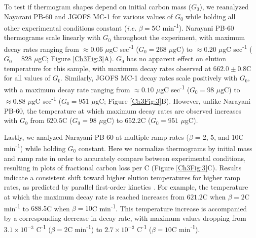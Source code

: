 To test if thermogram shapes depend on initial carbon mass ($G_0$), we reanalyzed Nayarani PB-60 and JGOFS MC-1 for various values of $G_0$ while holding all other experimental conditions constant (\textit{i.e.} $\beta = 5$\textdegree C min\textsuperscript{-1}). Narayani PB-60 thermograms scale linearly with $G_0$ throughout the experiment, with maximum decay rates ranging from $\approx 0.06$ $\mu$gC sec\textsuperscript{-1} ($G_0 = 268$ $\mu$gC) to $\approx 0.20$ $\mu$gC sec\textsuperscript{-1} ($G_0 = 828$ $\mu$gC; Figure \ref{Ch3Fig:3}A). $G_0$ has no apparent effect on elution temperature for this sample, with maximum decay rates observed at $662.0 \pm 0.8$\textdegree C for all values of $G_0$. Similarly, JGOFS MC-1 decay rates scale positively with $G_0$, with a maximum decay rate ranging from $\approx 0.10$ $\mu$gC sec\textsuperscript{-1} ($G_0 = 98$ $\mu$gC) to $\approx 0.88$ $\mu$gC sec\textsuperscript{-1} ($G_0 = 951$ $\mu$gC; Figure \ref{Ch3Fig:3}B). However, unlike Narayani PB-60, the temperature at which maximum decay rates are observed increases with $G_0$ from $620.5$\textdegree C ($G_0 = 98$ $\mu$gC) to $652.2$\textdegree C ($G_0 = 951$ $\mu$gC).

Lastly, we analyzed Narayani PB-60 at multiple ramp rates ($\beta$ = 2, 5, and 10\textdegree C min\textsuperscript{-1}) while holding $G_0$ constant. Here we normalize thermograms by initial mass and ramp rate in order to accurately compare between experimental conditions, resulting in plots of fractional carbon loss per \textdegree C (Figure \ref{Ch3Fig:3}C). Results indicate a consistent shift toward higher elution temperatures for higher ramp rates, as predicted by parallel first-order kinetics \citep{Braun:1987vf,Miura:1995uo,Miura:1998jf}. For example, the temperature at which the maximum decay rate is reached increases from $621.2$\textdegree C when $\beta = 2$\textdegree C min\textsuperscript{-1} to $688.5$\textdegree C when $\beta = 10$\textdegree C min\textsuperscript{-1}. This temperature increase is accompanied by a corresponding decrease in decay rate, with maximum values dropping from $3.1 \times 10^{-3}$ \textdegree C\textsuperscript{-1} ($\beta = 2$\textdegree C min\textsuperscript{-1}) to $2.7 \times 10^{-3}$ \textdegree C\textsuperscript{-1} ($\beta = 10$\textdegree C min\textsuperscript{-1}).

